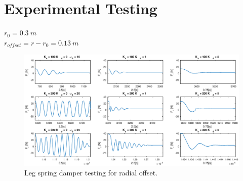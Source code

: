 \chapter{Experimental Testing}

$r_0 = 0.3\ m$\\
$r_{offset} = r - r_0 = 0.13\ m$

\begin{figure}
\centering
\includegraphics[width=1\textwidth]{images/logging/spring-damper-tests.eps} 
\caption{Leg spring damper testing for radial offset.}
\label{fig:spring-damper-tests}
\end{figure}

